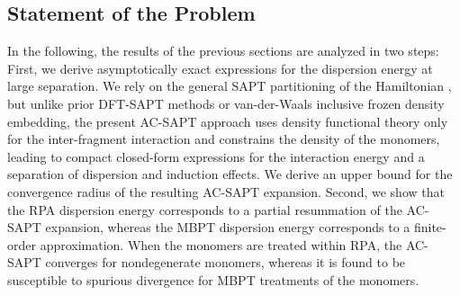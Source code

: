\documentclass[journal=jctcce,manuscript=article]{achemso}
\begin{document}
\subsection{Statement of the Problem}

In the following, the results of the previous sections are analyzed in
two steps: First, we derive asymptotically exact expressions for the
dispersion energy at large separation. We rely on the general SAPT
partitioning of the Hamiltonian \cite{doi:10.1063/1.461528}, but unlike
prior DFT-SAPT  methods\cite{doi:10.1002/wcms.1164,PhysRevLett.91.033201} 
or van-der-Waals inclusive frozen density embedding,\cite{doi:10.1021/j100132a040, 
  doi:10.1063/1.4890839} 
the present AC-SAPT approach uses density functional theory only for the
inter-fragment interaction and constrains the density of the monomers,
leading to compact closed-form expressions for the interaction energy
and a separation of dispersion and induction effects. We derive an upper
bound for the convergence radius of the resulting AC-SAPT expansion. Second,
we show that the RPA dispersion energy corresponds to a partial resummation
of the AC-SAPT expansion, whereas the MBPT dispersion energy corresponds to a
finite-order approximation. When the monomers are treated within RPA,
the AC-SAPT converges for nondegenerate monomers, whereas it is found to be
susceptible to spurious divergence for MBPT treatments of the monomers.
\end{document}

